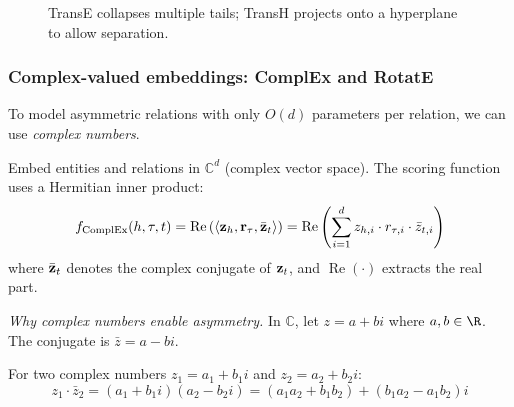\begin{notechapter}
\begin{figure}[htbp]
\caption{TransE collapses multiple tails; TransH projects onto a hyperplane to allow separation.}
\label{shallow-embeddings:fig:transX}
\end{figure}


\subsubsection{Complex-valued embeddings: ComplEx and RotatE}

To model asymmetric relations with only $O(d)$ parameters per relation, we can use \emph{complex numbers}.

\begin{definition}
Embed entities and relations in $\mathbb{C}^d$ (complex vector space). The scoring function uses a Hermitian inner product:
\begin{equation}
f_{\text{ComplEx}}(h, \tau, t) = \operatorname{Re}\left(\langle \mathbf{z}_h, \mathbf{r}_\tau, \bar{\mathbf{z}}_t \rangle\right) = \operatorname{Re}\left(\sum_{i=1}^{d} z_{h,i} \cdot r_{\tau,i} \cdot \bar{z}_{t,i}\right)
\end{equation}
where $\bar{\mathbf{z}}_t$ denotes the complex conjugate of $\mathbf{z}_t$, and $\operatorname{Re}(\cdot)$ extracts the real part.
\end{definition}

\begin{intuition}
\emph{Why complex numbers enable asymmetry.}
In $\mathbb{C}$, let $z = a + bi$ where $a, b \in \R$. The conjugate is $\bar{z} = a - bi$.

For two complex numbers $z_1 = a_1 + b_1 i$ and $z_2 = a_2 + b_2 i$:
\[
z_1 \cdot \bar{z}_2 = (a_1 + b_1 i)(a_2 - b_2 i) = (a_1 a_2 + b_1 b_2) + (b_1 a_2 - a_1 b_2)i
\]


\end{intuition}
\end{notechapter}
